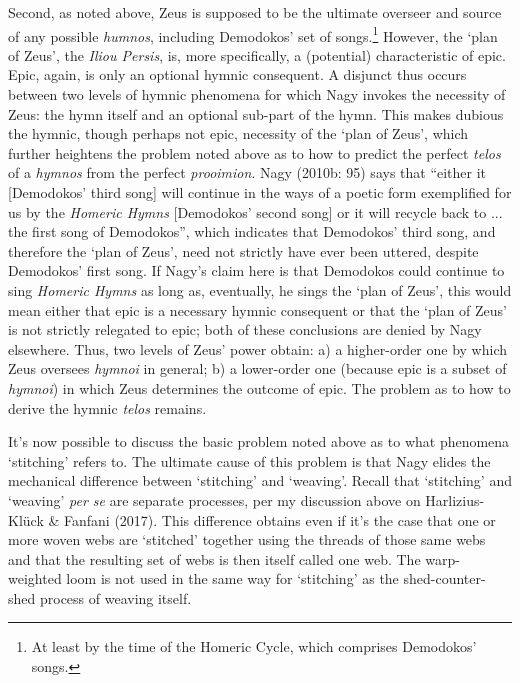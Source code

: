 \documentclass[12pt]{article}
\begin{document}
Second, as noted above, Zeus is supposed to be the ultimate overseer and source of any possible \textit{humnos}, including Demodokos' set of songs.\footnote{ At least by the time of the Homeric Cycle, which comprises Demodokos' songs.} However, the `plan of Zeus', the \textit{Iliou Persis}, is, more specifically, a (potential) characteristic of epic. Epic, again, is only an optional hymnic consequent. A disjunct thus occurs between two levels of hymnic phenomena for which Nagy invokes the necessity of Zeus: the hymn itself and an optional sub-part of the hymn. This makes dubious the hymnic, though perhaps not epic, necessity of the `plan of Zeus', which further heightens the problem noted above as to how to predict the perfect \textit{telos} of a \textit{hymnos} from the perfect \textit{prooimion}. Nagy (2010b: 95) says that ``either it [Demodokos' third song] will continue in the ways of a poetic form exemplified for us by the \textit{Homeric Hymns} [Demodokos' second song] or it will recycle back to ... the first song of Demodokos'', which indicates that Demodokos' third song, and therefore the `plan of Zeus', need not strictly have ever been uttered, despite Demodokos' first song. If Nagy's claim here is that Demodokos could continue to sing \textit{Homeric Hymns} as long as, eventually, he sings the `plan of Zeus', this would mean either that epic is a necessary hymnic consequent or that the `plan of Zeus' is not strictly relegated to epic; both of these conclusions are denied by Nagy elsewhere. Thus, two levels of Zeus' power obtain: a) a higher-order one by which Zeus oversees \textit{hymnoi} in general; b) a lower-order one (because epic is a subset of \textit{hymnoi}) in which Zeus determines the outcome of epic. The problem as to how to derive the hymnic \textit{telos} remains.

It's now possible to discuss the basic problem noted above as to what phenomena `stitching' refers to. The ultimate cause of this problem is that Nagy elides the mechanical difference between `stitching' and `weaving'. Recall that `stitching' and `weaving' \textit{per se} are separate processes, per my discussion above on Harlizius-Kl\"{u}ck \& Fanfani (2017). This difference obtains even if it's the case that one or more woven webs are `stitched' together using the threads of those same webs and that the resulting set of webs is then itself called one web. The warp-weighted loom is not used in the same way for `stitching' as the shed-counter-shed process of weaving itself. 
\end{document}
